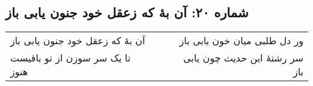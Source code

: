 \begin{center}
\section*{شماره ۲۰: آن بۀ که زعقل خود جنون یابی باز}
\label{sec:020}
\begin{longtable}{l p{0.5cm} r}
آن بهٔ که زعقل خود جنون یابی باز
&&
ور دل طلبی میان خون یابی باز
\\
تا یک سر سوزن از تو باقیست هنوز
&&
سر رشتهٔ این حدیث چون یابی باز
\\
\end{longtable}
\end{center}
